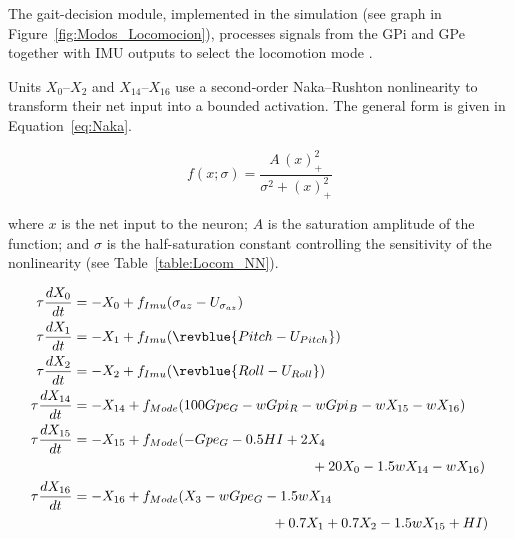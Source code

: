 The gait-decision module, implemented in the simulation (see graph in Figure~\ref{fig:Modos_Locomocion}), processes signals from the GPi and GPe together with IMU outputs to select the locomotion mode .

Units $X_0$--$X_2$ and $X_{14}$--$X_{16}$ use a second-order Naka--Rushton nonlinearity to transform their net input into a bounded activation. The general form is given in Equation~\eqref{eq:Naka}.

\begin{equation}
f(x;\sigma) = \frac{A\,(x)_+^2}{\sigma^2 + (x)_+^2}
\label{eq:Naka}
\end{equation}

where $x$ is the net input to the neuron; $A$ is the saturation amplitude of the function; and $\sigma$ is the half-saturation constant controlling the sensitivity of the nonlinearity (see Table~\ref{table:Locom_NN}).


\begin{align}
\tau \frac{dX_0}{dt} &= -X_0 + f_{Imu}(\sigma_{az} - U_{\sigma_{az}})
\label{eq:Z0}
\\
\tau \frac{dX_1}{dt} &= -X_1 +  f_{Imu}( \revblue{Pitch - U_{Pitch}})
\\
\tau \frac{dX_2}{dt} &= -X_2 +  f_{Imu}( \revblue{Roll - U_{Roll}})
\\
\tau \frac{dX_{14}}{dt} &= -X_{14} +  f_{Mode}(100 Gpe_G - w Gpi_R  - w Gpi_B - w X_{15} - w X_{16})
\\
\tau \frac{dX_{15}}{dt} &= -X_{15} +f_{Mode}( -Gpe_G - 0.5HI + 2X_4 \notag\\
&\hspace*{6cm}+ 20X_0 - 1.5wX_{14} - wX_{16})
\\
\tau \frac{dX_{16}}{dt} &= -X_{16} +  f_{Mode}( X_3 - wGpe_G - 1.5wX_{14}\notag\\
&\hspace{5cm}+ 0.7X_1 + 0.7X_2 - 1.5wX_{15} + HI)
\label{eq:Z16}
\end{align}

